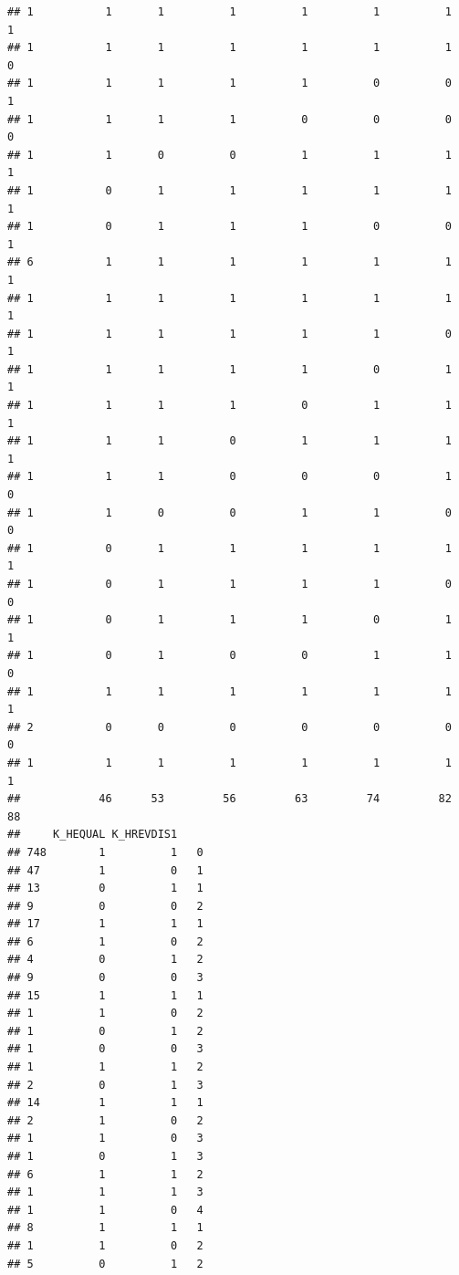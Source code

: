 \documentclass[
]{article}
\begin{document}
\begin{verbatim}
## 1           1       1          1          1          1          1          1
## 1           1       1          1          1          1          1          0
## 1           1       1          1          1          0          0          1
## 1           1       1          1          0          0          0          0
## 1           1       0          0          1          1          1          1
## 1           0       1          1          1          1          1          1
## 1           0       1          1          1          0          0          1
## 6           1       1          1          1          1          1          1
## 1           1       1          1          1          1          1          1
## 1           1       1          1          1          1          0          1
## 1           1       1          1          1          0          1          1
## 1           1       1          1          0          1          1          1
## 1           1       1          0          1          1          1          1
## 1           1       1          0          0          0          1          0
## 1           1       0          0          1          1          0          0
## 1           0       1          1          1          1          1          1
## 1           0       1          1          1          1          0          0
## 1           0       1          1          1          0          1          1
## 1           0       1          0          0          1          1          0
## 1           1       1          1          1          1          1          1
## 2           0       0          0          0          0          0          0
## 1           1       1          1          1          1          1          1
##            46      53         56         63         74         82         88
##     K_HEQUAL K_HREVDIS1    
## 748        1          1   0
## 47         1          0   1
## 13         0          1   1
## 9          0          0   2
## 17         1          1   1
## 6          1          0   2
## 4          0          1   2
## 9          0          0   3
## 15         1          1   1
## 1          1          0   2
## 1          0          1   2
## 1          0          0   3
## 1          1          1   2
## 2          0          1   3
## 14         1          1   1
## 2          1          0   2
## 1          1          0   3
## 1          0          1   3
## 6          1          1   2
## 1          1          1   3
## 1          1          0   4
## 8          1          1   1
## 1          1          0   2
## 5          0          1   2

\end{verbatim}
\end{document}
